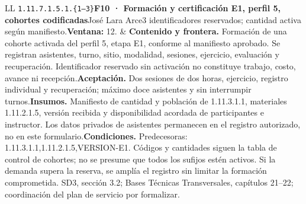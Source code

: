 \begin{longtable}{L{\tabcolsep\relax}L{\tabcolsep\relax}}
\texttt{1.\allowbreak{}11.\allowbreak{}7.\allowbreak{}1.\allowbreak{}5.\allowbreak{}1.\allowbreak{}\{1--3\}}\newline{}\textbf{F10 · Formación y certificación E1, perfil 5, cohortes codificadas}\newline{}José Lara Arce\newline{}3 identificadores reservados; cantidad activa según manifiesto.\newline{}\textbf{Ventana:} 12. & \textbf{Contenido y frontera.} Formación de una cohorte activada del perfil 5, etapa E1, conforme al manifiesto aprobado. Se registran asistentes, turno, sitio, modalidad, sesiones, ejercicio, evaluación y recuperación. Identificador reservado sin activación no constituye trabajo, costo, avance ni recepción.\newline{}\textbf{Aceptación.} Dos sesiones de dos horas, ejercicio, registro individual y recuperación; máximo doce asistentes y sin interrumpir turnos.\newline{}\textbf{Insumos.} Manifiesto de cantidad y población de 1.11.3.1.1, materiales 1.11.2.1.5, versión recibida y disponibilidad acordada de participantes e instructor. Los datos privados de asistentes permanecen en el registro autorizado, no en este formulario.\newline{}\textbf{Condiciones.} Predecesoras: 1.11.3.1.1,1.11.2.1.5,VERSION-E1. Códigos y cantidades siguen la tabla de control de cohortes; no se presume que todos los sufijos estén activos. Si la demanda supera la reserva, se amplía el registro sin limitar la formación comprometida. SD3, sección 3.2; Bases Técnicas Transversales, capítulos 21--22; coordinación del plan de servicio por formalizar.\\\hline

\end{longtable}
